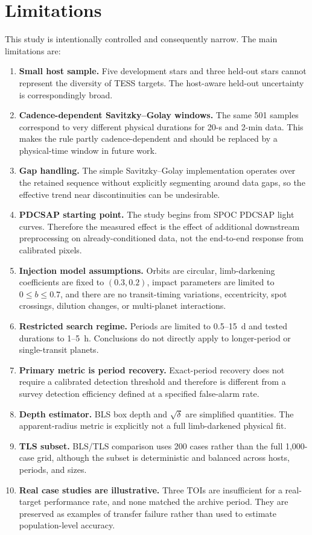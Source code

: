 \documentclass[11pt]{article}
\begin{document}
\section{Limitations}
This study is intentionally controlled and consequently narrow. The main limitations are:
\begin{enumerate}
\item \textbf{Small host sample.} Five development stars and three held-out stars cannot represent the diversity of TESS targets. The host-aware held-out uncertainty is correspondingly broad.
\item \textbf{Cadence-dependent Savitzky--Golay windows.} The same 501 samples correspond to very different physical durations for 20-s and 2-min data. This makes the rule partly cadence-dependent and should be replaced by a physical-time window in future work.
\item \textbf{Gap handling.} The simple Savitzky--Golay implementation operates over the retained sequence without explicitly segmenting around data gaps, so the effective trend near discontinuities can be undesirable.
\item \textbf{PDCSAP starting point.} The study begins from SPOC PDCSAP light curves. Therefore the measured effect is the effect of additional downstream preprocessing on already-conditioned data, not the end-to-end response from calibrated pixels.
\item \textbf{Injection model assumptions.} Orbits are circular, limb-darkening coefficients are fixed to $(0.3,0.2)$, impact parameters are limited to $0\leq b\leq0.7$, and there are no transit-timing variations, eccentricity, spot crossings, dilution changes, or multi-planet interactions.
\item \textbf{Restricted search regime.} Periods are limited to 0.5--15~d and tested durations to 1--5~h. Conclusions do not directly apply to longer-period or single-transit planets.
\item \textbf{Primary metric is period recovery.} Exact-period recovery does not require a calibrated detection threshold and therefore is different from a survey detection efficiency defined at a specified false-alarm rate.
\item \textbf{Depth estimator.} BLS box depth and $\sqrt{\delta}$ are simplified quantities. The apparent-radius metric is explicitly not a full limb-darkened physical fit.
\item \textbf{TLS subset.} BLS/TLS comparison uses 200 cases rather than the full 1,000-case grid, although the subset is deterministic and balanced across hosts, periods, and sizes.
\item \textbf{Real case studies are illustrative.} Three TOIs are insufficient for a real-target performance rate, and none matched the archive period. They are preserved as examples of transfer failure rather than used to estimate population-level accuracy.
\end{enumerate}
\end{document}
